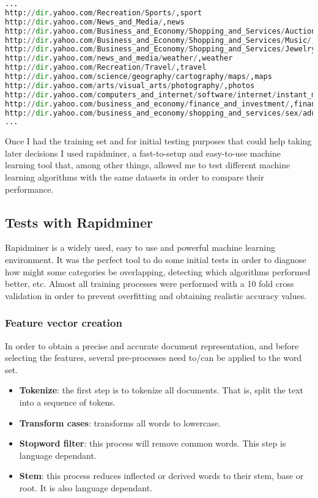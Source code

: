\begin{lstlisting}[language=Python]
...
http://dir.yahoo.com/Recreation/Sports/,sport
http://dir.yahoo.com/News_and_Media/,news
http://dir.yahoo.com/Business_and_Economy/Shopping_and_Services/Auctions/,shopping
http://dir.yahoo.com/Business_and_Economy/Shopping_and_Services/Music/,shopping
http://dir.yahoo.com/Business_and_Economy/Shopping_and_Services/Jewelry/,shopping
http://dir.yahoo.com/news_and_media/weather/,weather
http://dir.yahoo.com/Recreation/Travel/,travel
http://dir.yahoo.com/science/geography/cartography/maps/,maps
http://dir.yahoo.com/arts/visual_arts/photography/,photos
http://dir.yahoo.com/computers_and_internet/software/internet/instant_messaging/,instant_messaging
http://dir.yahoo.com/business_and_economy/finance_and_investment/,financial
http://dir.yahoo.com/business_and_economy/shopping_and_services/sex/adult_galleries/,adult
...
\end{lstlisting}

Once I had the training set and for initial testing purposes that could help taking later decisions I used rapidminer\cite{rapidminer}, a fast-to-setup and easy-to-use machine learning tool that, 
among other things, allowed me to test different machine learning algorithms with the same datasets in order to compare their performance. 

  


\subsection{Tests with Rapidminer}
Rapidminer\cite{rapidminer} is a widely used, easy to use and powerful machine learning environment.  
It was the perfect tool to do some initial tests in order to diagnose how might some categories be overlapping, detecting which algorithms performed better, etc. Almost all training processes were 
performed with a 10 fold cross validation in order to prevent overfitting and obtaining realistic accuracy values.

\subsubsection{Feature vector creation}
In order to obtain a precise and accurate document representation, and before selecting the features, several pre-processes need to/can be applied to the word set.
\begin{itemize}
  \item {\bf Tokenize}: the first step is to tokenize all documents. That is, split the text into a sequence of tokens. 
  \item {\bf Transform cases}: transforms all words to lowercase.
  \item {\bf Stopword filter}: this process will remove common words. This step is language dependant.
  \item {\bf Stem}: this process reduces inflected or derived words to their stem, base or root. It is also language dependant.
\end{itemize}



